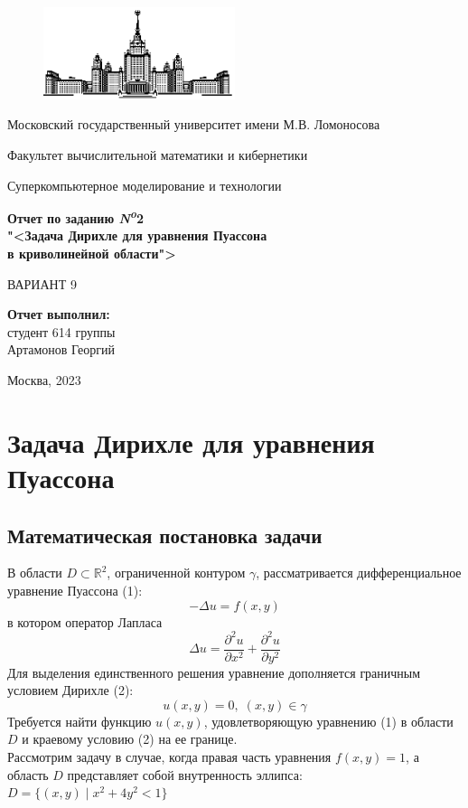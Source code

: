 \documentclass[oneside,final,14pt]{extreport}
\newcommand\No{{\itshape N\textsuperscript{o}}}
\begin{document}
\thispagestyle{empty}
\begin{figure}[t]
  \centering
  \includegraphics[width=0.5\textwidth]{msu}
\end{figure}
\centerline{Московский государственный университет имени М.В. Ломоносова}
\centerline{Факультет вычислительной математики и кибернетики}
\centerline{\hfill\hrulefill\hrulefill\hfill}
\vfill
\vfill
\large
\centerline{Суперкомпьютерное моделирование и технологии}
\vfill
\Large
\begin{centering}
{\bf Отчет по заданию \No 2 \\
"<Задача Дирихле для уравнения Пуассона \\
в криволинейной области">\\}
\end{centering}
\normalsize
\vfill
\centerline{ВАРИАНТ 9}
\vfill
\vfill
\vfill
\begin{flushright}
\textbf{Отчет выполнил:}\\
студент 614 группы\\
Артамонов Георгий
\end{flushright}
\vfill
\vfill
\centerline{Москва, 2023}
\newpage
\tableofcontents
\newpage
\chapter{Задача Дирихле для уравнения Пуассона}
\section{Математическая постановка задачи}
\noindent
В области \( D \subset \mathbb{R}^2 \), ограниченной контуром \(\gamma\),
рассматривается дифференциальное уравнение Пуассона (1):
\[
-\Delta u = f(x, y)
\]
в котором оператор Лапласа
\[
\Delta u = \frac{\partial^2 u}{\partial x^2} + \frac{\partial^2 u}{\partial y^2}
\]
Для выделения единственного решения уравнение дополняется
граничным условием Дирихле (2):
\[ u(x, y) = 0, \; (x, y) \in \gamma \]
Требуется найти функцию \( u(x, y) \), удовлетворяющую уравнению (1)
в области \( D \) и краевому условию (2) на ее границе. \\
Рассмотрим задачу в случае, когда правая часть уравнения \( f(x, y) = 1 \),
а область \( D \) представляет собой внутренность эллипса:
\( D = \{ (x, y) \; | \; x^2 + 4 y^2 < 1 \} \)
\end{document}
